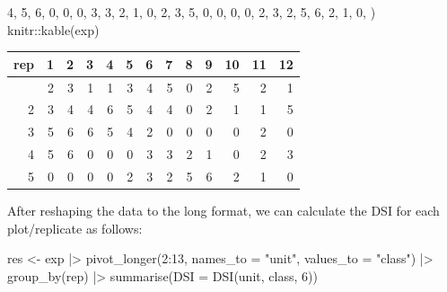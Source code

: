 \documentclass[
  letterpaper,
  DIV=11,
  numbers=noendperiod]{scrreprt}
\newenvironment{Shaded}{\begin{snugshade}}{\end{snugshade}}
\newcommand{\AttributeTok}[1]{\textcolor[rgb]{0.40,0.45,0.13}{#1}}
\newcommand{\DecValTok}[1]{\textcolor[rgb]{0.68,0.00,0.00}{#1}}
\newcommand{\FunctionTok}[1]{\textcolor[rgb]{0.28,0.35,0.67}{#1}}
\newcommand{\NormalTok}[1]{\textcolor[rgb]{0.00,0.23,0.31}{#1}}
\newcommand{\OtherTok}[1]{\textcolor[rgb]{0.00,0.23,0.31}{#1}}
\newcommand{\SpecialCharTok}[1]{\textcolor[rgb]{0.37,0.37,0.37}{#1}}
\newcommand{\StringTok}[1]{\textcolor[rgb]{0.13,0.47,0.30}{#1}}
\begin{document}
\begin{Shaded}
\begin{Highlighting}[]
  \DecValTok{4}\NormalTok{, }\DecValTok{5}\NormalTok{, }\DecValTok{6}\NormalTok{, }\DecValTok{0}\NormalTok{, }\DecValTok{0}\NormalTok{, }\DecValTok{0}\NormalTok{, }\DecValTok{3}\NormalTok{, }\DecValTok{3}\NormalTok{, }\DecValTok{2}\NormalTok{, }\DecValTok{1}\NormalTok{, }\DecValTok{0}\NormalTok{, }\DecValTok{2}\NormalTok{, }\DecValTok{3}\NormalTok{, }
  \DecValTok{5}\NormalTok{, }\DecValTok{0}\NormalTok{, }\DecValTok{0}\NormalTok{, }\DecValTok{0}\NormalTok{, }\DecValTok{0}\NormalTok{, }\DecValTok{2}\NormalTok{, }\DecValTok{3}\NormalTok{, }\DecValTok{2}\NormalTok{, }\DecValTok{5}\NormalTok{, }\DecValTok{6}\NormalTok{, }\DecValTok{2}\NormalTok{, }\DecValTok{1}\NormalTok{, }\DecValTok{0}\NormalTok{,}
\NormalTok{)}
\NormalTok{knitr}\SpecialCharTok{::}\FunctionTok{kable}\NormalTok{(exp)}
\end{Highlighting}
\end{Shaded}

\begin{longtable}[]{@{}rrrrrrrrrrrrr@{}}
\toprule\noalign{}
rep & 1 & 2 & 3 & 4 & 5 & 6 & 7 & 8 & 9 & 10 & 11 & 12 \\
\midrule\noalign{}
\endhead
\bottomrule\noalign{}
\endlastfoot
1 & 2 & 3 & 1 & 1 & 3 & 4 & 5 & 0 & 2 & 5 & 2 & 1 \\
2 & 3 & 4 & 4 & 6 & 5 & 4 & 4 & 0 & 2 & 1 & 1 & 5 \\
3 & 5 & 6 & 6 & 5 & 4 & 2 & 0 & 0 & 0 & 0 & 2 & 0 \\
4 & 5 & 6 & 0 & 0 & 0 & 3 & 3 & 2 & 1 & 0 & 2 & 3 \\
5 & 0 & 0 & 0 & 0 & 2 & 3 & 2 & 5 & 6 & 2 & 1 & 0 \\
\end{longtable}

After reshaping the data to the long format, we can calculate the DSI
for each plot/replicate as follows:

\begin{Shaded}
\begin{Highlighting}[]
\NormalTok{res }\OtherTok{\textless{}{-}}\NormalTok{ exp }\SpecialCharTok{|\textgreater{}} 
  \FunctionTok{pivot\_longer}\NormalTok{(}\DecValTok{2}\SpecialCharTok{:}\DecValTok{13}\NormalTok{, }\AttributeTok{names\_to =} \StringTok{"unit"}\NormalTok{, }\AttributeTok{values\_to =} \StringTok{"class"}\NormalTok{) }\SpecialCharTok{|\textgreater{}}
  \FunctionTok{group\_by}\NormalTok{(rep) }\SpecialCharTok{|\textgreater{}} 
  \FunctionTok{summarise}\NormalTok{(}\AttributeTok{DSI =} \FunctionTok{DSI}\NormalTok{(unit, class, }\DecValTok{6}\NormalTok{))}
\end{Highlighting}
\end{Shaded}
\end{document}
